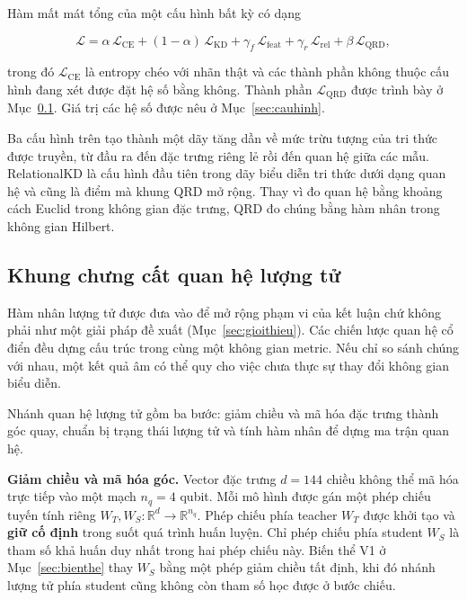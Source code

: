 Hàm mất mát tổng của một cấu hình bất kỳ có dạng

\begin{equation}
\label{eq:total}
\mathcal{L} = \alpha\,\mathcal{L}_{\mathrm{CE}}
  + (1-\alpha)\,\mathcal{L}_{\mathrm{KD}}
  + \gamma_{f}\,\mathcal{L}_{\mathrm{feat}}
  + \gamma_{r}\,\mathcal{L}_{\mathrm{rel}}
  + \beta\,\mathcal{L}_{\mathrm{QRD}},
\end{equation}

trong đó $\mathcal{L}_{\mathrm{CE}}$ là entropy chéo với nhãn thật và các
thành phần không thuộc cấu hình đang xét được đặt hệ số bằng không. Thành
phần $\mathcal{L}_{\mathrm{QRD}}$ được trình bày ở Mục~\ref{sec:qrd}. Giá
trị các hệ số được nêu ở Mục~\ref{sec:cauhinh}.

Ba cấu hình trên tạo thành một dãy tăng dần về mức trừu tượng của tri thức
được truyền, từ đầu ra đến đặc trưng riêng lẻ rồi đến quan hệ giữa các mẫu.
RelationalKD là cấu hình đầu tiên trong dãy biểu diễn tri thức dưới dạng
quan hệ và cũng là điểm mà khung QRD mở rộng. Thay vì đo quan hệ bằng
khoảng cách Euclid trong không gian đặc trưng, QRD đo chúng bằng hàm nhân
trong không gian Hilbert.

\subsection{Khung chưng cất quan hệ lượng tử}
\label{sec:qrd}

Hàm nhân lượng tử được đưa vào để mở rộng phạm vi của kết luận chứ không
phải như một giải pháp đề xuất (Mục~\ref{sec:gioithieu}). Các chiến lược
quan hệ cổ điển đều dựng cấu trúc trong cùng một không gian metric. Nếu chỉ
so sánh chúng với nhau, một kết quả âm có thể quy cho việc chưa thực sự thay
đổi không gian biểu diễn.

Nhánh quan hệ lượng tử gồm ba bước: giảm chiều và mã hóa đặc trưng thành
góc quay, chuẩn bị trạng thái lượng tử và tính hàm nhân để dựng ma trận
quan hệ.

\textbf{Giảm chiều và mã hóa góc.} Vector đặc trưng $d = 144$ chiều không thể
mã hóa trực tiếp vào một mạch $n_q = 4$ qubit. Mỗi mô hình được gán một phép
chiếu tuyến tính riêng $W_T, W_S : \mathbb{R}^{d} \to \mathbb{R}^{n_q}$. Phép
chiếu phía teacher $W_T$ được khởi tạo và \textbf{giữ cố định} trong suốt quá
trình huấn luyện. Chỉ phép chiếu phía student $W_S$ là tham số khả huấn duy
nhất trong hai phép chiếu này. Biến thể V1 ở Mục~\ref{sec:bienthe} thay $W_S$
bằng một phép giảm chiều tất định, khi đó nhánh lượng tử phía student cũng
không còn tham số học được ở bước chiếu.

